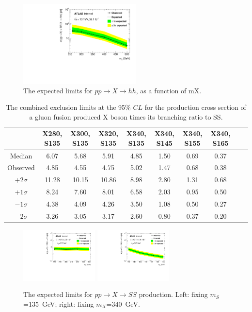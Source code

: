 \begin{figure}[!h!tpb]
  \centering
  \includegraphics[width=0.55\textwidth, angle=-90]{fig/Statistical/limitAllSys.pdf}
  \caption{  The expected limits for $pp\rightarrow X \rightarrow hh$, as a function of mX.}
\label{fig:limit_plots_2lss}
\end{figure}

\begin{table}[h]
\scriptsize
\begin{center}
\begin{tabular}{cccccccccc}
\hline
\hline
& X280, S135 &X300, S135 &X320, S135 &X340, S135 &X340, S145  &X340, S155 &X340, S165 \\
\hline
Median &6.07 &5.68 &5.91 &4.85 &1.50 &0.69 &0.37 \\
Observed &4.85 &4.55 &4.75 &5.02 &1.47 &0.68 &0.38 \\
\hline
$+2\sigma$ &11.28 &10.15 &10.86 &8.98 &2.80 &1.31 &0.68 \\
$+1\sigma$ &8.24 &7.60 &8.01 &6.58 &2.03 &0.95 &0.50 \\
$-1\sigma$ &4.38 &4.09 &4.26 &3.50 &1.08 &0.50 &0.27 \\
$-2\sigma$ &3.26 &3.05 &3.17 &2.60 &0.80 &0.37 &0.20 \\
\hline
\hline
\end{tabular}
\caption{The combined exclusion limits at the 95$\%$ $CL$ for the production cross section of a gluon fusion produced X boson times its branching ratio to SS.}
\label{tab:limits_HSS_combined}
\end{center}
\end{table}
\begin{figure}[!h!tpb]
  \centering
  \includegraphics[width=0.35\textwidth, angle=-90]{fig/Statistical/limit_HSS_S135_AllSys.pdf}
  \includegraphics[width=0.35\textwidth, angle=-90]{fig/Statistical/limit_HSS_H340_AllSys.pdf}
  \caption{The expected limits for $pp\rightarrow X \rightarrow SS$ production. Left: fixing $m_S$=135~GeV; right: fixing $m_X$=340~GeV.}
\label{fig:limit_HSS}
\end{figure}